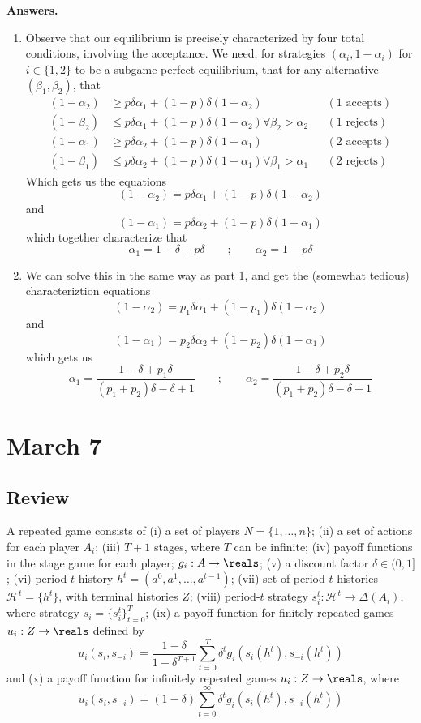 \documentclass[10pt]{article}
\begin{document}
\textbf{Answers.}

\begin{enumerate}
	\item Observe that our equilibrium is precisely characterized by four total conditions, involving the acceptance. We need, for strategies $(\alpha_i,1-\alpha_i)$ for $i \in \{1,2\}$ to be a subgame perfect equilibrium, that for any alternative $(\beta_1,\beta_2)$, that\begin{align*} (1-\alpha_2) &\ge p \delta \alpha_1 + (1-p)\delta (1-\alpha_2) &&(1 \text{ accepts}) \\ (1-\beta_2) &\le p \delta \alpha_1 + (1-p)\delta (1-\alpha_2) \forall \beta_2 > \alpha_2 &&(1 \text{ rejects}) \\ (1-\alpha_1) &\ge p \delta \alpha_2 + (1-p)\delta (1-\alpha_1) &&(2 \text{ accepts}) \\ (1-\beta_1) &\le p \delta \alpha_2 + (1-p)\delta (1-\alpha_1) \forall \beta_1 > \alpha_1 &&(2 \text{ rejects}) \end{align*}Which gets us the equations\[(1-\alpha_2 ) = p\delta \alpha_1 + (1-p)\delta (1-\alpha_2) \]and \[(1-\alpha_1) = p\delta \alpha_2 + (1-p)\delta (1-\alpha_1)\]which together characterize that \[\alpha_1 = 1-\delta + p\delta \qquad ; \qquad \alpha_2 = 1-p\delta\]
	\item We can solve this in the same way as part 1, and get the (somewhat tedious) characteriztion equations \[(1-\alpha_2) = p_1\delta \alpha_1 + (1-p_1)\delta (1-\alpha_2)\]and \[(1-\alpha_1) = p_2\delta \alpha_2 + (1-p_2) \delta (1-\alpha_1)\]which gets us\[\alpha_1 = \frac{1-\delta+p_1\delta}{(p_1+p_2)\delta - \delta + 1} \qquad ; \qquad \alpha_2 = \frac{1-\delta+p_2\delta}{(p_1+p_2)\delta - \delta + 1}\]
\end{enumerate}

\section{March 7}

\subsection{Review}

\begin{definition}
	A repeated game consists of (i) a set of players $N = \{1,\dots,n\}$; (ii) a set of actions for each player $A_i$; (iii) $T+1$ stages, where $T$ can be infinite; (iv) payoff functions in the stage game for each player; $g_i: A \to \reals$; (v) a discount factor $\delta \in (0,1]$; (vi) period-$t$ history $h^t = (a^0,a^1,\dots,a^{t-1})$; (vii) set of period-$t$ histories $\mathcal{H}^t = \{h^t\}$, with terminal histories $Z$; (viii) period-$t$ strategy $s_i^t: \mathcal{H}^t \to \Delta(A_i)$, where strategy $s_i = \{s_i^t\}_{t=0}^T$; (ix) a payoff function for finitely repeated games $u_i: Z \to \reals$ defined by \[u_i(s_i,s_{-i}) = \frac{1-\delta}{1-\delta^{T+1}} \sum_{t=0}^T \delta^t g_i(s_i(h^t),s_{-i}(h^t))\] and (x) a payoff function for infinitely repeated games $u_i:Z \to \reals$, where \[u_i(s_i,s_{-i}) = (1-\delta) \sum_{t=0}^\infty \delta^t g_i(s_i(h^t),s_{-i}(h^t))\]
\end{definition}
\end{document}
